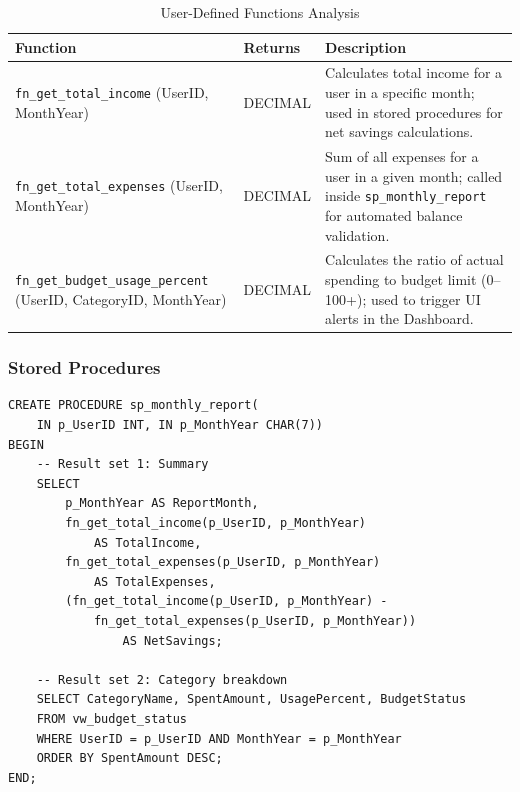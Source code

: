 \documentclass[12pt, a4paper]{article}
\begin{document}
\begin{table}[H]
\centering
\caption{User-Defined Functions Analysis}
\label{tab:udfs}
\begin{tabularx}{\textwidth}{>{\raggedright\arraybackslash}p{5.5cm} l X}
\toprule
\textbf{Function} & \textbf{Returns} & \textbf{Description} \\
\midrule
\texttt{fn\_get\_total\_income} \newline \footnotesize (UserID, MonthYear)
  & DECIMAL & Calculates total income for a user in a specific month; used in
             stored procedures for net savings calculations. \\
\addlinespace
\texttt{fn\_get\_total\_expenses} \newline \footnotesize (UserID, MonthYear)
  & DECIMAL & Sum of all expenses for a user in a given month; called inside
             \texttt{sp\_monthly\_report} for automated balance validation. \\
\addlinespace
\texttt{fn\_get\_budget\_usage\_percent} \newline \footnotesize (UserID, CategoryID, MonthYear)
  & DECIMAL & Calculates the ratio of actual spending to budget limit (0--100+);
             used to trigger UI alerts in the Dashboard. \\
\bottomrule
\end{tabularx}
\end{table}

\subsubsection{Stored Procedures}

\begin{lstlisting}[style=sqlstyle, caption={Stored Procedure: sp\_monthly\_report}]
CREATE PROCEDURE sp_monthly_report(
    IN p_UserID INT, IN p_MonthYear CHAR(7))
BEGIN
    -- Result set 1: Summary
    SELECT 
        p_MonthYear AS ReportMonth,
        fn_get_total_income(p_UserID, p_MonthYear) 
            AS TotalIncome,
        fn_get_total_expenses(p_UserID, p_MonthYear) 
            AS TotalExpenses,
        (fn_get_total_income(p_UserID, p_MonthYear) - 
            fn_get_total_expenses(p_UserID, p_MonthYear)) 
                AS NetSavings;

    -- Result set 2: Category breakdown
    SELECT CategoryName, SpentAmount, UsagePercent, BudgetStatus
    FROM vw_budget_status
    WHERE UserID = p_UserID AND MonthYear = p_MonthYear
    ORDER BY SpentAmount DESC;
END;
\end{lstlisting}
\end{document}
